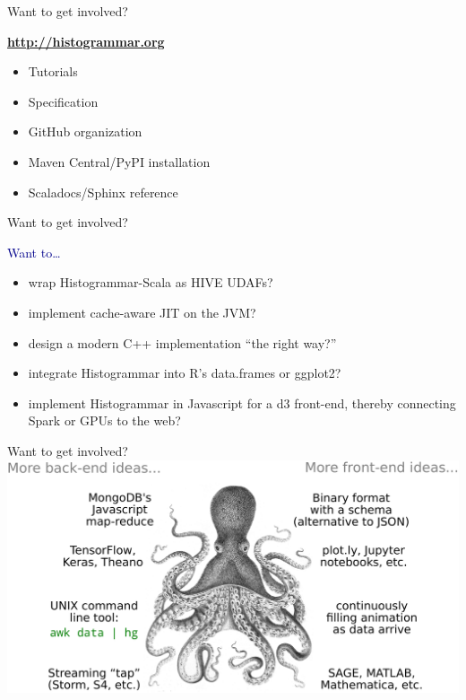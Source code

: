 \documentclass[aspectratio=169]{beamer}
\begin{document}
\begin{frame}{Want to get involved?}
\begin{center}
\begin{minipage}{0.55\linewidth}
\Large
\textcolor{blue}{\textbf{\url{http://histogrammar.org}}}

\begin{itemize}
\item Tutorials
\item Specification
\item GitHub organization
\item Maven Central/PyPI installation
\item Scaladocs/Sphinx reference
\end{itemize}
\end{minipage}
\end{center}
\end{frame}

\begin{frame}{Want to get involved?}
\begin{center}
\begin{minipage}{0.9\linewidth}
\Large
\textcolor{darkblue}{Want to\ldots}
\begin{itemize}\setlength{\itemsep}{0.35 cm}
\item wrap Histogrammar-Scala as HIVE UDAFs?
\item implement cache-aware JIT on the JVM?
\item design a modern C++ implementation ``the right way?''
\item integrate Histogrammar into R's data.frames or ggplot2?
\item implement Histogrammar in Javascript for a d3 front-end, thereby connecting Spark or GPUs to the web?
\end{itemize}
\end{minipage}
\end{center}
\end{frame}

\begin{frame}{Want to get involved?}
\vspace{0.5 cm}
\includegraphics[width=\linewidth]{octopus_ending.pdf}
\end{frame}
\end{document}
